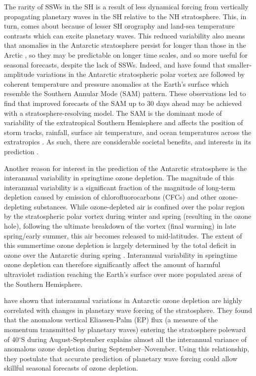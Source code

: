 The rarity of SSWs in the SH is a result of less dynamical forcing from vertically propagating planetary waves in the SH relative to the NH stratosphere. This, in turn, comes about because of lesser SH orography and land-sea temperature contrasts which can excite planetary waves. This reduced variability also means that anomalies in the Antarctic stratosphere persist for longer than those in the Arctic \citep{Simpson2011}, so they may be predictable on longer time scales, and so more useful for seasonal forecasts, despite the lack of SSWs. Indeed, \citet{Thompson2005} and \citet{Son2013a} have found that smaller-amplitude variations in the Antarctic stratospheric polar vortex are followed by coherent temperature and pressure anomalies at the Earth's surface which resemble the Southern Annular Mode (SAM) pattern. These observations led \citet{Roff2011} to find that improved forecasts of the SAM up to 30 days ahead may be achieved with a stratosphere-resolving model. The SAM is the dominant mode of variability of the extratropical Southern Hemisphere and affects the position of storm tracks, rainfall, surface air temperature, and ocean temperatures across the extratropics \citep[e.g.,][]{Silvestri2003, Reason2005, Hendon2007}. As such, there are considerable societal benefits, and interests in its prediction \citep{Lim2013}. 

Another reason for interest in the prediction of the Antarctic stratosphere is the interannual variability in springtime ozone depletion. The magnitude of this interannual variability is a significant fraction of the magnitude of long-term depletion caused by emission of chlorofluorocarbons (CFCs) and other ozone-depleting substances. While ozone-depleted air is confined over the polar region by the stratospheric polar vortex during winter and spring (resulting in the ozone hole), following the ultimate breakdown of the vortex (final warming) in late spring/early summer, this air becomes released to mid-latitudes. The extent of this summertime ozone depletion is largely determined by the total deficit in ozone over the Antarctic during spring \citep{Bodeker2005}. Interannual variability in springtime ozone depletion can therefore significantly affect the amount of harmful ultraviolet radiation reaching the Earth's surface over more populated areas of the Southern Hemisphere.

\citet{Salby2012} have shown that interannual variations in Antarctic ozone depletion are highly correlated with changes in planetary wave forcing of the stratosphere. They found that the anomalous vertical Eliassen-Palm (EP) flux (a measure of the momentum transmitted by planetary waves) entering the stratosphere poleward of 40$^{\circ}$S during August-September explains almost all the interannual variance of anomalous ozone depletion during September--November. Using this relationship, they postulate that accurate prediction of planetary wave forcing could allow skillful seasonal forecasts of ozone depletion.

